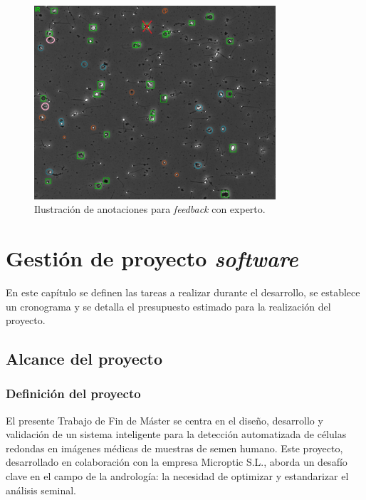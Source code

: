 \documentclass[12pt,a4paper,onecolumn,oneside]{report}
\begin{document}
\begin{figure}[htbp]
  \centering
  \includegraphics[width=0.8\textwidth]{figuras/rounds_cells/feedback_experto.png}
  \caption{Ilustración de anotaciones para \textit{feedback} con experto.}
  \label{fig:feedback_experto}
\end{figure}

\chapter{Gestión de proyecto \textit{software}} %
\label{Gestión de proyecto software}

En este capítulo se definen las tareas a realizar durante el desarrollo,
se establece un cronograma y se detalla el presupuesto estimado para la realización del proyecto.

\section{Alcance del proyecto}
\label{sec:Alcance del proyecto}

\subsection{Definición del proyecto}
\label{sec:Definición del proyecto}

El presente Trabajo de Fin de Máster se centra en el diseño, desarrollo y validación de un sistema inteligente 
para la detección automatizada de células redondas en imágenes médicas de muestras de semen humano. 
Este proyecto, desarrollado en colaboración con la empresa Microptic S.L., 
aborda un desafío clave en el campo de la andrología: la necesidad de optimizar y estandarizar el análisis seminal.
\end{document}
